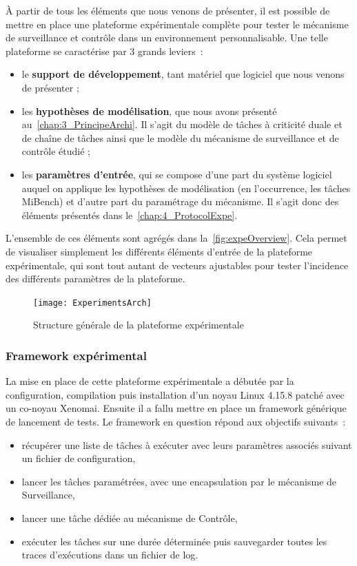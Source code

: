 \documentclass[french, a4paper, 11pt, twoside, pdftex]{StyleThese}
\begin{document}
    À partir de tous les éléments que nous venons de présenter, il est possible de mettre en place une plateforme expérimentale complète pour tester le mécanisme de surveillance et contrôle dans un environnement personnalisable. Une telle plateforme se caractérise par 3 grands leviers~: \begin{itemize}
    	\item le \textbf{support de développement}, tant matériel que logiciel que nous venons de présenter ;
    	\item les \textbf{hypothèses de modélisation}, que nous avons présenté au~\autoref{chap:3_PrincipeArchi}. Il s'agit du modèle de tâches à criticité duale et de chaîne de tâches ainsi que le modèle du mécanisme de surveillance et de contrôle étudié ;
    	\item les \textbf{paramètres d'entrée}, qui se compose d'une part du système logiciel auquel on applique les hypothèses de modélisation (en l’occurrence, les tâches MiBench) et d'autre part du paramétrage du mécanisme. Il s'agit donc des éléments présentés dans le~\autoref{chap:4_ProtocolExpe}.
    \end{itemize}
	L'ensemble de ces éléments sont agrégés dans la~\autoref{fig:expeOverview}. Cela permet de visualiser simplement les différents éléments d'entrée de la plateforme expérimentale, qui sont tout autant de vecteurs ajustables pour tester l'incidence des différents paramètres de la plateforme. 
	
	\begin{figure}[ht]
		\centering
		\texttt{[image: ExperimentsArch]}
		\caption{Structure générale de la plateforme expérimentale\label{fig:expeOverview}}
	\end{figure}

    	\subsubsection{Framework expérimental}
    
    La mise en place de cette plateforme expérimentale a débutée par la configuration, compilation puis installation d'un noyau Linux 4.15.8 patché avec un co-noyau Xenomai. Ensuite il a fallu mettre en place un framework générique de lancement de tests. Le framework en question répond aux objectifs suivants~:
    \begin{itemize}
    	\item récupérer une liste de tâches à exécuter avec leurs paramètres associés suivant un fichier de configuration,
    	\item lancer les tâches paramétrées, avec une encapsulation par le mécanisme de Surveillance,
    	\item lancer une tâche dédiée au mécanisme de Contrôle,
    	\item exécuter les tâches sur une durée déterminée puis sauvegarder toutes les traces d'exécutions dans un fichier de log.
    \end{itemize}
\end{document}
